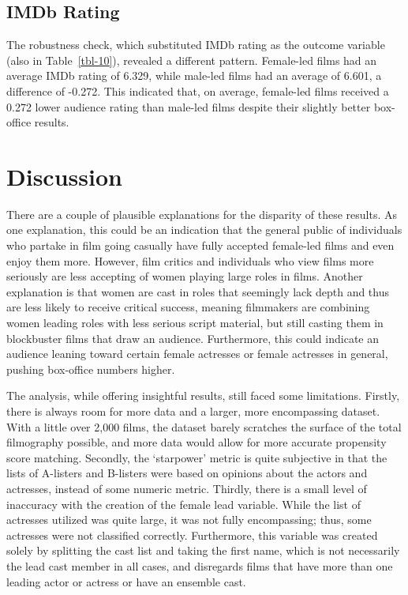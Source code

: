 \documentclass[
]{agujournal2019}
\begin{document}
\subsection{IMDb Rating}\label{imdb-rating}

The robustness check, which substituted IMDb rating as the outcome
variable (also in Table~\ref{tbl-10}), revealed a different pattern.
Female-led films had an average IMDb rating of 6.329, while male-led
films had an average of 6.601, a difference of -0.272. This indicated
that, on average, female-led films received a 0.272 lower audience
rating than male-led films despite their slightly better box-office
results.

\section{Discussion}\label{sec-discuss}

There are a couple of plausible explanations for the disparity of these
results. As one explanation, this could be an indication that the
general public of individuals who partake in film going casually have
fully accepted female-led films and even enjoy them more. However, film
critics and individuals who view films more seriously are less accepting
of women playing large roles in films. Another explanation is that women
are cast in roles that seemingly lack depth and thus are less likely to
receive critical success, meaning filmmakers are combining women leading
roles with less serious script material, but still casting them in
blockbuster films that draw an audience. Furthermore, this could
indicate an audience leaning toward certain female actresses or female
actresses in general, pushing box-office numbers higher.

The analysis, while offering insightful results, still faced some
limitations. Firstly, there is always room for more data and a larger,
more encompassing dataset. With a little over 2,000 films, the dataset
barely scratches the surface of the total filmography possible, and more
data would allow for more accurate propensity score matching. Secondly,
the `starpower' metric is quite subjective in that the lists of
A-listers and B-listers were based on opinions about the actors and
actresses, instead of some numeric metric. Thirdly, there is a small
level of inaccuracy with the creation of the female lead variable. While
the list of actresses utilized was quite large, it was not fully
encompassing; thus, some actresses were not classified correctly.
Furthermore, this variable was created solely by splitting the cast list
and taking the first name, which is not necessarily the lead cast member
in all cases, and disregards films that have more than one leading actor
or actress or have an ensemble cast.
\end{document}
